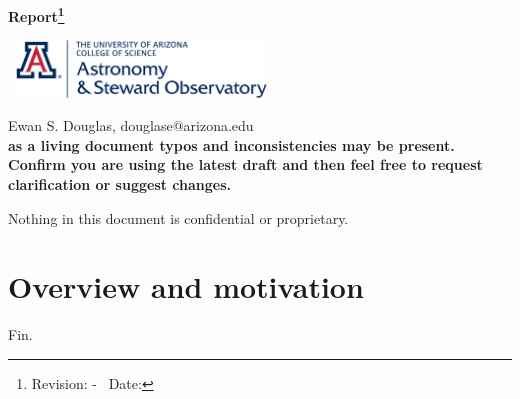 \documentclass[12pt]{book}
\begin{document}
\begin{titlepage}
\begin{center}

\vspace*{\fill}
{\large \bfseries Report\footnote{{ Revision: \gitAbbrevHash - \gitDirty\ Date: \gitCommitterDate}}}
\vspace*{20cm}
\end{center}


\end{titlepage}
\newpage
\begin{center}

\vspace{7cm }
\
\includegraphics[width=0.5\textwidth]{images/steward_logo.png}
\vspace{2cm }

Ewan S. Douglas, douglase@arizona.edu\\

\textbf{as a living document typos and inconsistencies may be present. Confirm you are using the latest draft and then feel free to request clarification or suggest changes.}

Nothing in this document is confidential or proprietary.


\end{center}


\tableofcontents

\linenumbers

\chapter{Overview and motivation}
\printglossary[type=main,nonumberlist]


\sloppy %
%
%

Fin.
\end{document}

